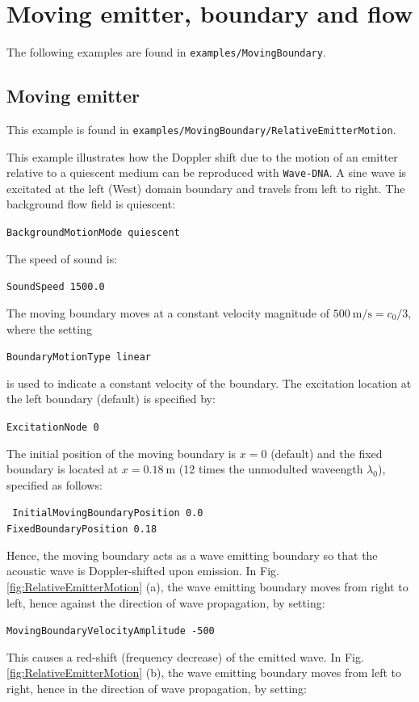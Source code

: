 \section{Moving emitter, boundary and flow}
\label{sec:Moving emitter, boundary and flow}

The following examples are found in {\tt examples/MovingBoundary}.

\subsection{Moving emitter}
\label{sec:Moving emitter}

This example is found in {\tt examples/MovingBoundary/RelativeEmitterMotion}.

This example illustrates how the Doppler shift due to the motion of an emitter relative to a quiescent medium can be reproduced with {\tt Wave-DNA}. A sine wave is excitated at the left (West) domain boundary and travels from left to right. The background flow field is quiescent:

{\tt BackgroundMotionMode quiescent}

The speed of sound is:

{\tt SoundSpeed 1500.0}

The moving boundary moves at a constant velocity magnitude of $500\:\mathrm{m/s}=c_0/3$, where the setting

    {\tt BoundaryMotionType linear}

is used to indicate a constant velocity of the boundary. The excitation location at the left boundary (default) is specified by:

{\tt ExcitationNode 0}

The initial position of the moving boundary is $x=0$ (default) and the fixed boundary is located at $x=0.18\:\mathrm{m}$ (12 times the unmodulted waveength $\lambda_0$), specified as follows:

{\tt
InitialMovingBoundaryPosition 0.0 \\
FixedBoundaryPosition 0.18
}

Hence, the moving boundary acts as a wave emitting boundary so that the acoustic wave is Doppler-shifted upon emission. In Fig. \ref{fig:RelativeEmitterMotion} (a), the wave emitting boundary moves from right to left, hence against the direction of wave propagation, by setting:

{\tt MovingBoundaryVelocityAmplitude -500}

This causes a red-shift (frequency decrease) of the emitted wave. In Fig. \ref{fig:RelativeEmitterMotion} (b), the wave emitting boundary moves from left to right, hence in the direction of wave propagation, by setting:

